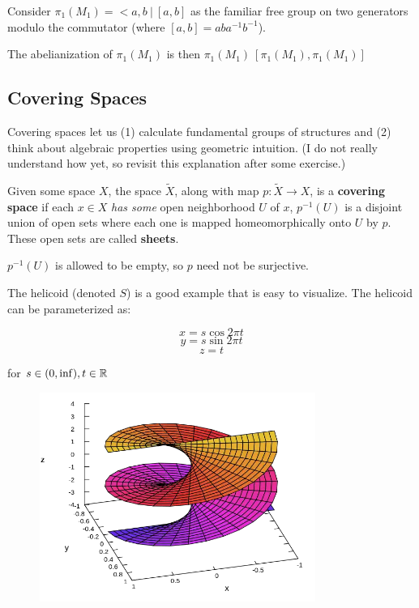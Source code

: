 \documentclass[10pt]{article}
\begin{document}
\begin{note}[Abelianization of $\pi_1(M_1)$]
	Consider $\pi_1(M_1) = < a, b ~|~ [a, b]$ as the familiar free group on two
	generators modulo the commutator (where $[a, b] = aba^{-1}b^{-1}$).

	The abelianization of $\pi_1(M_1)$ is then $\pi_1(M_1) \ [\pi_1(M_1), \pi_1(M_1)]$
\end{note}

\subsection{Covering Spaces}

Covering spaces let us (1) calculate fundamental groups of structures and (2)
think about algebraic properties using geometric intuition. (I do not really
understand how yet, so revisit this explanation after some exercise.)

\begin{definition}

	Given some space $X$, the space $\tilde{X}$, along with map $p: \tilde{X} \to
	X$, is a \textbf{covering space} if each $x \in X$ \textit{has some} open neighborhood
	$U$ of $x$, $p^{-1}(U)$ is a disjoint union of open sets where each one is
	mapped homeomorphically onto $U$ by $p$. These open sets are called
	\textbf{sheets}.
	
	$p^{-1}(U)$ is allowed to be empty, so $p$ need not be surjective.

\end{definition}

The helicoid (denoted $S$) is a good example that is easy to visualize. The helicoid can be
parameterized as: 

\[x = s \cos 2\pi t \]
\[y = s \sin 2\pi t \]
\[z = t \]

for $s \in (0, \inf), t \in \mathbb{R}$

\begin{figure}[ht!]
\centering
\includegraphics[width=90mm]{./helicoid.png}
\caption{}
\end{figure}
\end{document}
